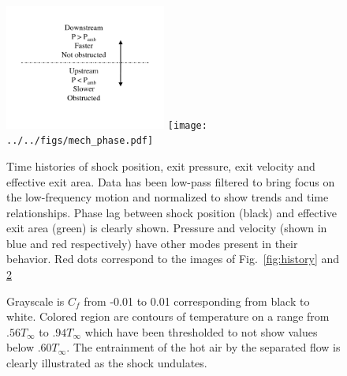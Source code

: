 \documentclass[]{aiaa-tc}%
\begin{document}
\begin{figure}[!h]%
	\begin{center}
	\includegraphics[trim = 3in 0in 2in 0in, clip,width=2.085in]{figs/phase_key.pdf}
	\texttt{[image: ../../figs/mech\_phase.pdf]}
	\end{center}
 	\caption{Time histories of shock position, exit pressure, exit velocity and effective exit area.  Data has been low-pass filtered to bring focus on the low-frequency motion and normalized to show trends and time relationships.  Phase lag between shock position (black) and effective exit area (green) is clearly shown.  Pressure and velocity (shown in blue and red respectively) have other modes present in their behavior.  Red dots correspond to the images of Fig.~\ref{fig:history} and \ref{fig:whistory}   }
 	\label{fig:phase}
\end{figure}



\begin{figure}
  \centering
  
  \hspace{0.1in}	            
  \hspace{0.1in}	
  
  
  \hspace{0.1in}	            
  \hspace{0.1in}	
  
  
  \hspace{0.1in}	            
  \hspace{0.1in}	
  
  \caption{Grayscale is $C_f$ from -0.01 to 0.01 corresponding from black to white.  Colored region are contours of temperature on a range from $.56T_{\infty}$ to $.94T_{\infty}$ which have been thresholded to not show values below $.60T_{\infty}$.  The entrainment of the hot air by the separated flow is clearly illustrated as the shock undulates.  }
  
  \label{fig:whistory}
\end{figure}
\end{document}
